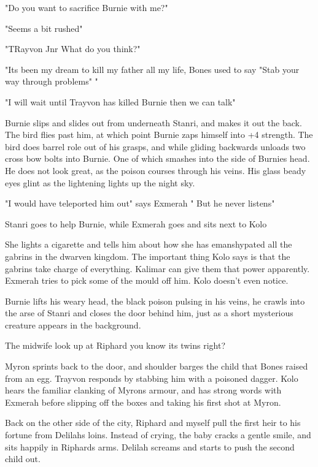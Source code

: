 "Do you want to sacrifice Burnie with me?"\medskip

"Seems a bit rushed"\medskip

"TRayvon Jnr What do you think?"\medskip

"Its been my dream to kill my father all my life, Bones used to say "Stab your way through problems" "\medskip

"I will wait until Trayvon has killed Burnie then we can talk"\medskip

Burnie slips and slides out from underneath Stanri, and makes it out the back. The bird flies past him, at which point Burnie zaps himself into +4 strength. The bird does barrel role out of his grasps, and while gliding backwards unloads two cross bow bolts into Burnie. One of which smashes into the side of Burnies head. He does not look great, as the poison courses through his veins. His glass beady eyes glint as the lightening lights up the night sky.\medskip

"I would have teleported him out" says Exmerah " But he never listens"\medskip

Stanri goes to help Burnie, while Exmerah goes and sits next to Kolo\medskip

She lights a cigarette and tells him about how she has emanshypated all the gabrins in the dwarven kingdom. The important thing Kolo says is that the gabrins take charge of everything. Kalimar can give them that power apparently. Exmerah tries to pick some of the mould off him. Kolo doesn't even notice.\medskip

Burnie lifts his weary head, the black poison pulsing in his veins, he crawls into the arse of Stanri and closes the door behind him, just as a short mysterious creature appears in the background.\medskip

The midwife look up at Riphard you know its twins right?\medskip

Myron sprints back to the door, and shoulder barges the child that Bones raised from an egg. Trayvon responds by stabbing him with a poisoned dagger. Kolo hears the familiar clanking of Myrons armour, and has strong words with Exmerah before slipping off the boxes and taking his first shot at Myron.\medskip

Back on the other side of the city, Riphard and myself pull the first heir to his fortune from Delilahs loins. Instead of crying, the baby cracks a gentle smile, and sits happily in Riphards arms. Delilah screams and starts to push the second child out.\medskip

